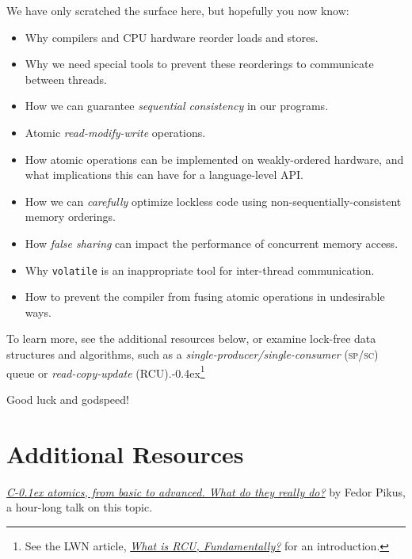 \documentclass[fontsize=10pt, oneside]{scrartcl}
\newcommand{\punckern}{\kern-0.4ex}
\newcommand{\monobox}[1]{\mbox{\texttt{#1}}}
\newcommand{\keyword}[1]{\monobox{\color{darkGreen}#1}}
\newcommand{\cplusplus}[1]{C\kern-0.1ex\raisebox{0.15ex}{\texttt{++}}#1}
\newcommand{\introduce}[1]{\textit{#1}}
\begin{document}
We have only scratched the surface here, but hopefully you now know:
\begin{itemize}
\item Why compilers and \textsc{CPU} hardware reorder loads and stores.
\item Why we need special tools to prevent these reorderings to communicate between threads.
\item How we can guarantee \introduce{sequential consistency} in our programs.
\item Atomic \introduce{read-modify-write} operations.
\item How atomic operations can be implemented on weakly-ordered hardware,
      and what implications this can have for a language-level \textsc{API}.
\item How we can \emph{carefully} optimize lockless code using non-sequentially-consistent memory orderings.
\item How \introduce{false sharing} can impact the performance of concurrent memory access.
\item Why \keyword{volatile} is an inappropriate tool for inter-thread communication.
\item How to prevent the compiler from fusing atomic operations in undesirable ways.
\end{itemize}
To learn more, see the additional resources below,
or examine lock-free data structures and algorithms,
such as a \introduce{single-producer/single-consumer} (\textsc{sp/sc}) queue or \introduce{read-copy-update}
(\textsc{RCU}).\punckern\footnote{%
See the LWN article,
\href{https://lwn.net/Articles/262464/}{\textit{What is RCU, Fundamentally?}} for an introduction.}

\vspace{\baselineskip}
\noindent Good luck and godspeed!
\newpage

\appendix
\setcounter{secnumdepth}{0}
\setfootnoterule{0pt}

\setlength\parskip{\baselineskip}
\setlength\parindent{0pt}
\section{Additional Resources}

\href{https://www.youtube.com/watch?v=ZQFzMfHIxng}{%
\textit{\cplusplus{} atomics, from basic to advanced. What do they really do?}}
by Fedor Pikus,
a hour-long talk on this topic.
\end{document}
